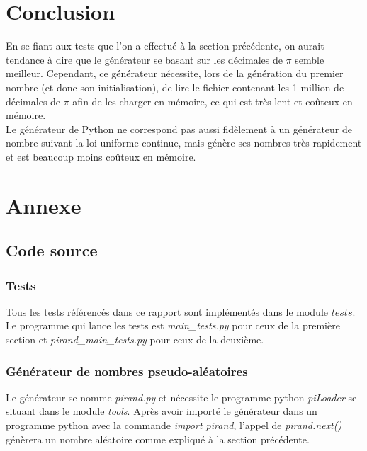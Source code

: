 \documentclass[10pt,a4paper]{article}
\begin{document}
\section{Conclusion}
En se fiant aux tests que l'on a effectué à la section précédente, on aurait tendance à dire que le générateur se basant sur les décimales de $\pi$ semble meilleur. Cependant, ce générateur nécessite, lors de la génération du premier nombre (et donc son initialisation), de lire le fichier contenant les 1 million de décimales de $\pi$ afin de les charger en mémoire, ce qui est très lent et coûteux en mémoire.\\
Le générateur de Python ne correspond pas aussi fidèlement à un générateur de nombre suivant la loi uniforme continue, mais génère ses nombres très rapidement et est beaucoup moins coûteux en mémoire.
\newpage
\section*{Annexe}
\subsection*{Code source}
\subsubsection*{Tests}
Tous les tests référencés dans ce rapport sont implémentés dans le module $tests$. Le programme qui lance les tests est \textit{main\_tests.py} pour ceux de la première section et \textit{pirand\_main\_tests.py} pour ceux de la deuxième.
\subsubsection*{Générateur de nombres pseudo-aléatoires}
Le générateur se nomme \textit{pirand.py} et nécessite le programme python \textit{piLoader} se situant dans le module \textit{tools}. Après avoir importé le générateur dans un programme python avec la commande \textit{import pirand}, l'appel de \textit{pirand.next()} génèrera un nombre aléatoire comme expliqué à la section précédente.
\end{document}
